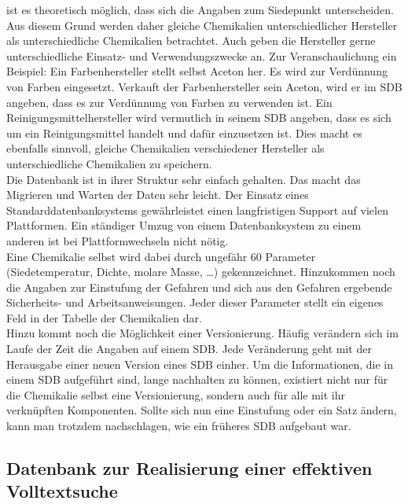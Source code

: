 ist es theoretisch möglich, dass sich die Angaben zum Siedepunkt unterscheiden.
Aus diesem Grund werden daher gleiche Chemikalien unterschiedlicher Hersteller
als unterschiedliche Chemikalien betrachtet. Auch geben die Hersteller gerne
unterschiedliche Einsatz- und Verwendungszwecke an. Zur Veranschaulichung ein
Beispiel: Ein Farbenhersteller stellt selbst Aceton her. Es wird zur Verdünnung
von Farben eingesetzt. Verkauft der Farbenhersteller sein Aceton, wird er im
\ac{SDB} angeben, dass es zur Verdünnung von Farben zu verwenden
ist. Ein Reinigungsmittelhersteller wird vermutlich in seinem
\ac{SDB} angeben, dass es sich um ein Reinigungsmittel handelt und
dafür einzusetzen ist. Dies macht es ebenfalls sinnvoll, gleiche Chemikalien
verschiedener Hersteller als unterschiedliche Chemikalien zu speichern.
\\
Die Datenbank ist in ihrer Struktur sehr einfach gehalten. Das macht das
Migrieren und Warten der Daten sehr leicht. Der Einsatz eines
Standarddatenbanksystems gewährleistet einen langfristigen Support auf vielen
Plattformen. Ein ständiger Umzug von einem Datenbanksystem zu einem anderen ist
bei Plattformwechseln nicht nötig.
\\
Eine Chemikalie selbst wird dabei durch ungefähr 60 Parameter
(Siedetemperatur, Dichte, molare Masse, \ldots) gekennzeichnet. Hinzukommen noch
die Angaben zur Einstufung der Gefahren und sich aus den Gefahren ergebende
Sicherheits- und Arbeitsanweisungen. Jeder dieser Parameter stellt ein eigenes
Feld in der Tabelle der Chemikalien dar.
\\
Hinzu kommt noch die Möglichkeit einer Versionierung. Häufig verändern sich im
Laufe der Zeit die Angaben auf einem \ac{SDB}. Jede Veränderung
geht mit der Herausgabe einer neuen Version eines \ac{SDB}
einher. Um die Informationen, die in einem \ac{SDB} aufgeführt sind,
lange nachhalten zu können, existiert nicht nur für die Chemikalie selbst eine
Versionierung, sondern auch für alle mit ihr verknüpften Komponenten. Sollte
sich nun eine Einstufung oder ein Satz ändern, kann man trotzdem nachschlagen,
wie ein früheres \ac{SDB} aufgebaut war.

\subsection{Datenbank zur Realisierung einer effektiven Volltextsuche}
\label{datenverwaltung_ii_kon}

